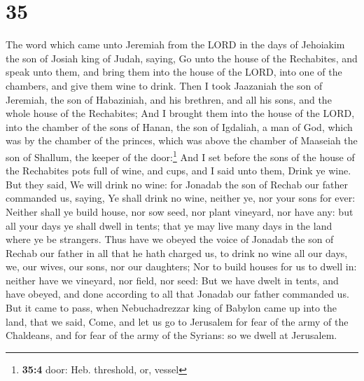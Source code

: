 \hypertarget{section-34}{%
\section{35}\label{section-34}}

 The word which came unto Jeremiah from the LORD in the
days of Jehoiakim the son of Josiah king of Judah, saying,
 Go unto the house of the Rechabites, and speak unto them,
and bring them into the house of the LORD, into one of the chambers, and
give them wine to drink.  Then I took Jaazaniah the son of
Jeremiah, the son of Habaziniah, and his brethren, and all his sons, and
the whole house of the Rechabites;  And I brought them
into the house of the LORD, into the chamber of the sons of Hanan, the
son of Igdaliah, a man of God, which was by the chamber of the princes,
which was above the chamber of Maaseiah the son of Shallum, the keeper
of the door:\footnote{\textbf{35:4} door: Heb. threshold, or, vessel}
 And I set before the sons of the house of the Rechabites
pots full of wine, and cups, and I said unto them, Drink ye wine.
 But they said, We will drink no wine: for Jonadab the son
of Rechab our father commanded us, saying, Ye shall drink no wine,
neither ye, nor your sons for ever:  Neither shall ye
build house, nor sow seed, nor plant vineyard, nor have any: but all
your days ye shall dwell in tents; that ye may live many days in the
land where ye be strangers.  Thus have we obeyed the voice
of Jonadab the son of Rechab our father in all that he hath charged us,
to drink no wine all our days, we, our wives, our sons, nor our
daughters;  Nor to build houses for us to dwell in:
neither have we vineyard, nor field, nor seed:  But we
have dwelt in tents, and have obeyed, and done according to all that
Jonadab our father commanded us.  But it came to pass,
when Nebuchadrezzar king of Babylon came up into the land, that we said,
Come, and let us go to Jerusalem for fear of the army of the Chaldeans,
and for fear of the army of the Syrians: so we dwell at Jerusalem.

